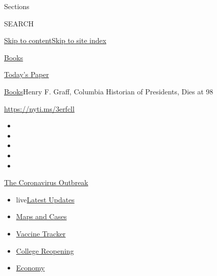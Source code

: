 Sections

SEARCH

\protect\hyperlink{site-content}{Skip to
content}\protect\hyperlink{site-index}{Skip to site index}

\href{https://www.nytimes.com/section/books}{Books}

\href{https://myaccount.nytimes.com/auth/login?response_type=cookie\&client_id=vi}{}

\href{https://www.nytimes.com/section/todayspaper}{Today's Paper}

\href{/section/books}{Books}\textbar{}Henry F. Graff, Columbia Historian
of Presidents, Dies at 98

\url{https://nyti.ms/3erfcll}

\begin{itemize}
\item
\item
\item
\item
\item
\end{itemize}

\href{https://www.nytimes.com/news-event/coronavirus?action=click\&pgtype=Article\&state=default\&region=TOP_BANNER\&context=storylines_menu}{The
Coronavirus Outbreak}

\begin{itemize}
\tightlist
\item
  live\href{https://www.nytimes.com/2020/08/03/world/coronavirus-covid-19.html?action=click\&pgtype=Article\&state=default\&region=TOP_BANNER\&context=storylines_menu}{Latest
  Updates}
\item
  \href{https://www.nytimes.com/interactive/2020/us/coronavirus-us-cases.html?action=click\&pgtype=Article\&state=default\&region=TOP_BANNER\&context=storylines_menu}{Maps
  and Cases}
\item
  \href{https://www.nytimes.com/interactive/2020/science/coronavirus-vaccine-tracker.html?action=click\&pgtype=Article\&state=default\&region=TOP_BANNER\&context=storylines_menu}{Vaccine
  Tracker}
\item
  \href{https://www.nytimes.com/2020/08/02/us/covid-college-reopening.html?action=click\&pgtype=Article\&state=default\&region=TOP_BANNER\&context=storylines_menu}{College
  Reopening}
\item
  \href{https://www.nytimes.com/live/2020/08/03/business/stock-market-today-coronavirus?action=click\&pgtype=Article\&state=default\&region=TOP_BANNER\&context=storylines_menu}{Economy}
\end{itemize}

